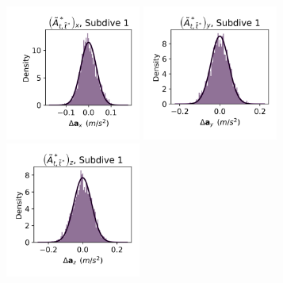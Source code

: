 \documentclass{article}
\begin{document}
        \begin{center}
        \includegraphics[width=1.75in]{../Plots/2019/20190902-182840-CATs_OB_1_0_267_CarHHMM1_empirical_hist_Ax_0.png}
        \includegraphics[width=1.75in]{../Plots/2019/20190902-182840-CATs_OB_1_0_267_CarHHMM1_empirical_hist_Ay_0.png}
        \includegraphics[width=1.75in]{../Plots/2019/20190902-182840-CATs_OB_1_0_267_CarHHMM1_empirical_hist_Az_0.png}
        

\end{center}
\end{document}
